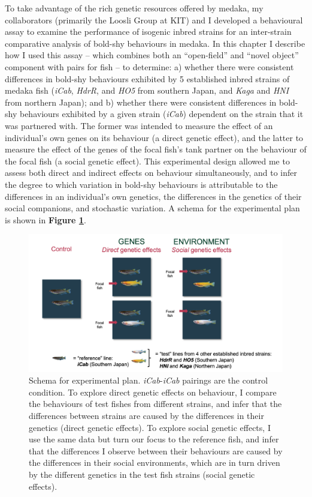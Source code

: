 \documentclass[
]{book}
\begin{document}
To take advantage of the rich genetic resources offered by medaka, my collaborators (primarily the Loosli Group at KIT) and I developed a behavioural assay to examine the performance of isogenic inbred strains for an inter-strain comparative analysis of bold-shy behaviours in medaka. In this chapter I describe how I used this assay -- which combines both an ``open-field'' and ``novel object'' component with pairs for fish -- to determine: a) whether there were consistent differences in bold-shy behaviours exhibited by 5 established inbred strains of medaka fish (\emph{iCab}, \emph{HdrR}, and \emph{HO5} from southern Japan, and \emph{Kaga} and \emph{HNI} from northern Japan); and b) whether there were consistent differences in bold-shy behaviours exhibited by a given strain (\emph{iCab}) dependent on the strain that it was partnered with. The former was intended to measure the effect of an individual's own genes on its behaviour (a direct genetic effect), and the latter to measure the effect of the genes of the focal fish's tank partner on the behaviour of the focal fish (a social genetic effect). This experimental design allowed me to assess both direct and indirect effects on behaviour simultaneously, and to infer the degree to which variation in bold-shy behaviours is attributable to the differences in an individual's own genetics, the differences in the genetics of their social companions, and stochastic variation. A schema for the experimental plan is shown in \textbf{Figure \ref{fig:behavioural-schema}}.



\begin{figure}
\includegraphics[width=1\linewidth]{figs/pilot/experimental_schema} \caption{Schema for experimental plan. \emph{iCab}-\emph{iCab} pairings are the control condition. To explore direct genetic effects on behaviour, I compare the behaviours of test fishes from different strains, and infer that the differences between strains are caused by the differences in their genetics (direct genetic effects). To explore social genetic effects, I use the same data but turn our focus to the reference fish, and infer that the differences I observe between their behaviours are caused by the differences in their social environments, which are in turn driven by the different genetics in the test fish strains (social genetic effects).}\label{fig:behavioural-schema}
\end{figure}
\end{document}
